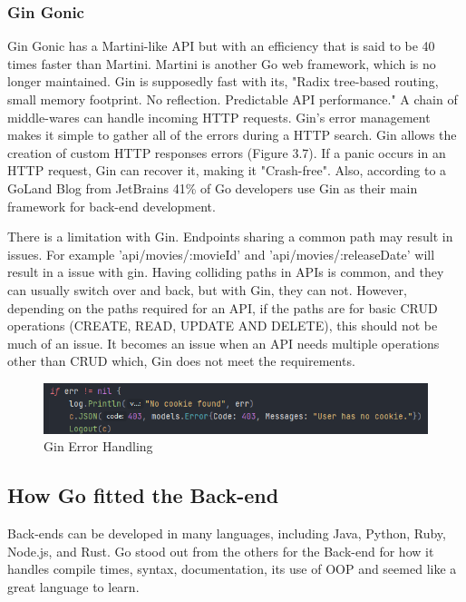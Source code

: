 \subsubsection{Gin Gonic}
Gin Gonic has a Martini-like API but with an efficiency that is said to be 40 times faster than Martini. Martini is another Go web framework, which is no longer maintained. Gin is supposedly fast with its, "Radix tree-based routing, small memory footprint. No reflection. Predictable API performance." A chain of middle-wares can handle incoming HTTP requests. Gin's error management makes it simple to gather all of the errors during a HTTP search. Gin allows the creation of custom HTTP responses errors (Figure 3.7). If a panic occurs in an HTTP request, Gin can recover it, making it "Crash-free". \cite{ref9} Also, according to a GoLand Blog from JetBrains 41\% of Go developers use Gin as their main framework for back-end development. \cite{ref10}

There is a limitation with Gin. Endpoints sharing a common path may result in issues. For example 'api/movies/:movieId' and 'api/movies/:releaseDate' will result in a issue with gin. Having colliding paths in APIs is common, and they can usually switch over and back, but with Gin, they can not. However, depending on the paths required for an API, if the paths are for basic CRUD operations (CREATE, READ, UPDATE AND DELETE), this should not be much of an issue. It becomes an issue when an API needs multiple operations other than CRUD which, Gin does not meet the requirements. 

\begin{figure}[H]
    \caption{Gin Error Handling}
    \label{image:ginError}
    \centering
    \includegraphics[width=1.0\textwidth]{images/misc/cookie-error.png}
\end{figure}

\subsection{How Go fitted the Back-end}
Back-ends can be developed in many languages, including Java, Python, Ruby, Node.js, and Rust. Go stood out from the others for the Back-end for how it handles compile times, syntax, documentation, its use of OOP and seemed like a great language to learn. 

